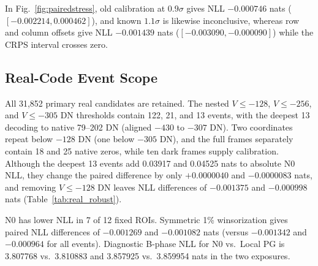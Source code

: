 \documentclass[10pt,twocolumn,journal]{IEEEtran}
\begin{document}
In Fig.~\ref{fig:pairedstress}, old calibration at $0.9\sigma$ gives NLL $-0.000746$ nats ($[-0.002214,0.000462]$), and known $1.1\sigma$ is likewise inconclusive, whereas row and column offsets give NLL $-0.001439$ nats ($[-0.003090,-0.000090]$) while the CRPS interval crosses zero.

\subsection{Real-Code Event Scope}\label{sec:realcode}
All 31,852 primary real candidates are retained. The nested $V\leq-128$, $V\leq-256$, and $V\leq-305$ DN thresholds contain 122, 21, and 13 events, with the deepest 13 decoding to native 79--202 DN (aligned $-430$ to $-307$ DN). Two coordinates repeat below $-128$ DN (one below $-305$ DN), and the full frames separately contain 18 and 25 native zeros, while ten dark frames supply calibration. Although the deepest 13 events add 0.03917 and 0.04525 nats to absolute N0 NLL, they change the paired difference by only $+0.0000040$ and $-0.0000083$ nats, and removing $V\leq-128$ DN leaves NLL differences of $-0.001375$ and $-0.000998$ nats (Table~\ref{tab:real_robust}).

N0 has lower NLL in 7 of 12 fixed ROIs. Symmetric 1\% winsorization gives paired NLL differences of $-0.001269$ and $-0.001082$ nats (versus $-0.001342$ and $-0.000964$ for all events). Diagnostic B-phase NLL for N0 vs.\ Local PG is 3.807768 vs.\ 3.810883 and 3.857925 vs.\ 3.859954 nats in the two exposures.
\end{document}
